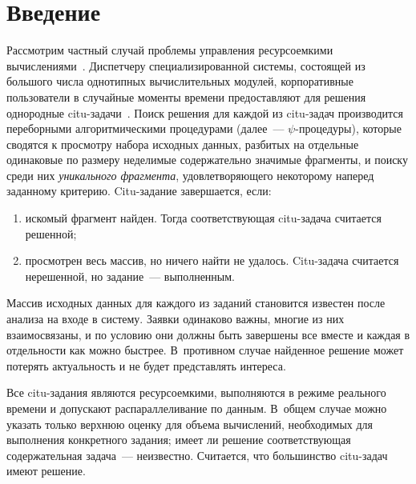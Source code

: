       \begin{multicols}{2}

            \label{st\stat}

\section{Введение}

Рассмотрим частный случай проблемы управления ресурсоемкими
вычислениями~\cite{Inf1-13}.  Диспетчеру специализированной системы,
состоящей из большого числа однотипных вычислительных модулей,
корпоративные пользователи в случайные моменты времени предоставляют
для решения однородные citu-за\-да\-чи~\cite{Mal412}. Поиск решения  для
каждой из citu-за\-дач  производится переборными алгоритмическими
процедурами  (далее~--- $\psi$-про\-це\-ду\-ры), которые сводятся к
просмотру набора исходных данных, разбитых на отдельные одинаковые
по размеру неделимые содержательно значимые фрагменты, и поиску
среди них \textit{уникального фрагмента}, удовлетворяющего
некоторому наперед заданному  критерию.  Citu-за\-да\-ние завершается,
если:
\begin{enumerate}[(1)]
\item  искомый фрагмент найден. Тогда соответствующая citu-задача
считается решенной;
\item
 просмотрен весь массив, но ничего найти не удалось. Citu-за\-да\-ча
считается нерешенной, но задание~--- выполненным.
\end{enumerate}

Массив исходных данных для каждого из заданий становится известен
после анализа  на входе в систему. Заявки одинаково важны, многие из
них взаимосвязаны, и по условию они должны быть завершены  все
вместе и каждая в отдельности как можно быстрее. В~противном случае
найденное решение может потерять актуальность и не будет
представлять интереса.

Все citu-задания являются ресурсоемкими, выполняются в режиме
реального времени и допускают распараллеливание по данным. В~общем
случае можно указать только верхнюю оценку для объема вычислений,
необходимых для выполнения конкретного задания; имеет ли решение
соответ\-ст\-ву\-ющая содержательная задача~--- неизвестно. Считается, что
большинство  citu-за\-дач имеют решение.


\end{multicols}
